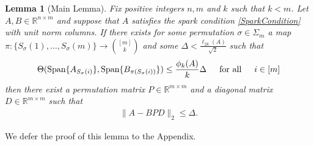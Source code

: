 \documentclass[journal, onecolumn]{IEEEtran}
\newtheorem{lemma}{Lemma}
\begin{document}
\begin{lemma}[Main Lemma]\label{MainLemma}
Fix positive integers $n, m$ and $k$ such that $k < m$. Let $A, B \in \mathbb{R}^{n \times m}$ and suppose that $A$ satisfies the spark condition \eqref{SparkCondition} with unit norm columns. If there exists for some permutation $\sigma \in \Sigma_m$ a map $\pi: \{S_{\sigma}(1), \ldots, S_{\sigma}(m)\} \to {[m] \choose k}$ and some $\Delta < \frac{\ell_{2k}(A)}{\sqrt{2}}$ such that 
\begin{equation}\label{GapUpperBound}
\Theta(\text{Span}\{A_{S_{\sigma}(i)}\}, \text{Span}\{B_{\pi(S_{\sigma}(i))}\}) \leq \frac{ \phi_k(A) }{k} \Delta \indent \text{for all} \indent i \in [m]
\end{equation}
%
then there exist a permutation matrix $P \in \mathbb{R}^{m \times m}$ and a diagonal matrix $D \in \mathbb{R}^{m \times m}$ such that
\begin{align}
\|A - BPD\|_2 \leq \Delta.
\end{align}
\end{lemma}

We defer the proof of this lemma to the Appendix. 

\end{document}
